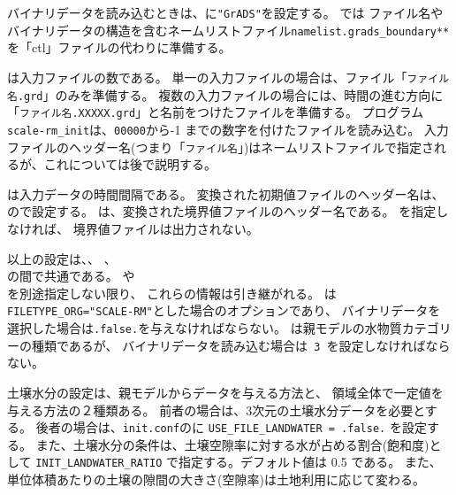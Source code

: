 バイナリデータを読み込むときは、に\verb|"GrADS"|を設定する。
\scalerm では ファイル名やバイナリデータの構造を含むネームリストファイル\verb|namelist.grads_boundary**|を「ctl」ファイルの代わりに準備する。

は入力ファイルの数である。
単一の入力ファイルの場合は、ファイル「\verb|ファイル名.grd|」のみを準備する。
複数の入力ファイルの場合には、時間の進む方向に「\verb|ファイル名.XXXXX.grd|」と名前をつけたファイルを準備する。
プログラム\verb|scale-rm_init|は、\verb|00000|から-1 までの数字を付けたファイルを読み込む。
入力ファイルのヘッダー名(つまり「\verb|ファイル名|」)はネームリストファイルで指定されるが、これについては後で説明する。

は入力データの時間間隔である。
変換された初期値ファイルのヘッダー名は、ので設定する。
は、変換された境界値ファイルのヘッダー名である。
を指定しなければ、 境界値ファイルは出力されない。

以上の設定は、、
、\\
の間で共通である。
や \\
を別途指定しない限り、
これらの情報は引き継がれる。
%
は\verb|FILETYPE_ORG="SCALE-RM"|とした場合のオプションであり、
バイナリデータを選択した場合は\verb|.false.|を与えなければならない。
は親モデルの水物質カテゴリーの種類であるが、
バイナリデータを読み込む場合は\verb| 3 |を設定しなければならない。

土壌水分の設定は、親モデルからデータを与える方法と、
領域全体で一定値を与える方法の２種類ある。
前者の場合は、3次元の土壌水分データを必要とする。
後者の場合は、\verb|init.conf|のに
\verb|USE_FILE_LANDWATER = .false.| を設定する。
また、土壌水分の条件は、土壌空隙率に対する水が占める割合(飽和度)として
\verb|INIT_LANDWATER_RATIO| で指定する。デフォルト値は 0.5 である。
また、単位体積あたりの土壌の隙間の大きさ(空隙率)は土地利用に応じて変わる。\\

